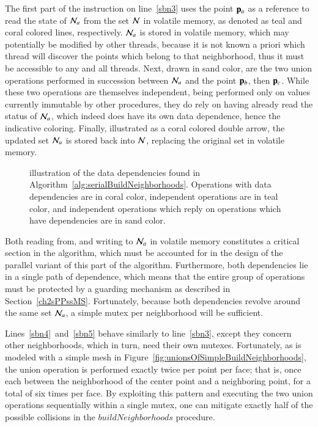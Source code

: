 The first part of the instruction on line~\ref{sbn3} uses the point $\mathbf{p}_a$ as a reference to read the state of $\mathcal{N}_a$ from the set $\mathcal{N}$ in volatile memory, as denoted as teal and coral colored lines, respectively. $\mathcal{N}_a$ is stored in volatile memory, which may potentially be modified by other threads, because it is not known a priori which thread will discover the points which belong to that neighborhood, thus it must be accessible to any and all threads. Next, drawn in sand color, are the two union operations performed in succession between $\mathcal{N}_a$ and the point $\mathbf{p}_b$, then $\mathbf{p}_c$. While these two operations are themselves independent, being performed only on values currently immutable by other procedures, they do rely on having already read the status of $\mathcal{N}_a$, which indeed does have its own data dependence, hence the indicative coloring. Finally, illustrated as a coral colored double arrow, the updated set $\mathcal{N}_a$ is stored back into $\mathcal{N}$, replacing the original set in volatile memory.

\begin{figure}[ht]
	
	{\caption[Data Dependencies in Serial Algorithm~\ref{alg:serialBuildNeighborhoods}: Build Neighborhoods]{illustration of the data dependencies found in Algorithm~\ref{alg:serialBuildNeighborhoods}. Operations with data dependencies are in coral color, independent operations are in teal color, and independent operations which reply on operations which have dependencies are in sand color.}\label{fig:sabnDataDependencies}}
\end{figure}

Both reading from, and writing to $\mathcal{N}_a$ in volatile memory constitutes a critical section in the algorithm, which must be accounted for in the design of the parallel variant of this part of the algorithm. Furthermore, both dependencies lie in a single path of dependence, which means that the entire group of operations must be protected by a guarding mechanism as described in Section~\ref{ch2sPPssMS}. Fortunately, because both dependencies revolve around the same set $\mathcal{N}_a$, a simple mutex per neighborhood will be sufficient. 

Lines~\ref{sbn4}~and~\ref{sbn5} behave similarly to line~\ref{sbn3}, except they concern other neighborhoods, which in turn, need their own mutexes. Fortunately, as is modeled with a simple mesh in Figure~\ref{fig:unionsOfSimpleBuildNeighborhoods}, the union operation is performed exactly twice per point per face; that is, once each between the neighborhood of the center point and a neighboring point, for a total of six times per face. By exploiting this pattern and executing the two union operations sequentially within a single mutex, one can mitigate exactly half of the possible collisions in the $\mathit{buildNeighborhoods}$ procedure.

